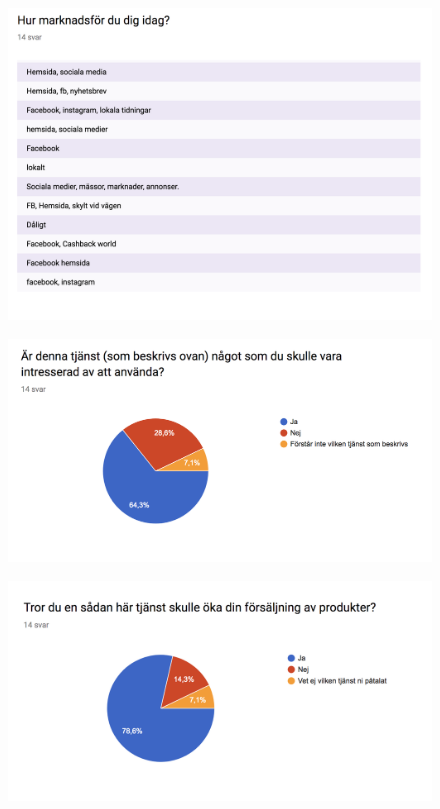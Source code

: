 \documentclass[10pt,a4paper,oneside]{article}
\begin{document}
\begin{figure}[H]
	\includegraphics[scale=0.6]{8.png}
\end{figure}

\begin{figure}[H]
	\includegraphics[scale=0.6]{9.png}
\end{figure}

\begin{figure}[H]
	\includegraphics[scale=0.6]{10.png}
\end{figure}
\end{document}
